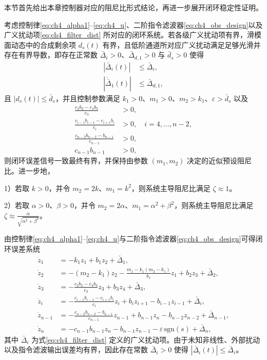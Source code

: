 本节首先给出本章控制器对应的阻尼比形式结论，再进一步展开闭环稳定性证明。

\begin{theorem}\label{thm:ch3_damping_ratio}
考虑控制律\eqref{eq:ch4_alpha1}--\eqref{eq:ch4_u}、二阶指令滤波器\eqref{eq:ch4_obs_design}以及广义扰动项\eqref{eq:ch4_filter_dist} 所对应的闭环系统。若各级广义扰动项有界，滑模面动态中的合成剩余项 $d_s(t)$ 有界，且低阶通道所对应广义扰动满足足够光滑并存在有界导数，即存在正常数 $\bar\Delta_i>0$、$\bar\Delta_{d,1}>0$ 与 $\bar d_s>0$ 使得
\begin{subequations}
\begin{align}
|\bar\Delta_i(t)|&\le \bar\Delta_i,\\
|\dot{\bar\Delta}_1(t)|&\le \bar\Delta_{d,1},
\end{align}
\end{subequations}
且 $|d_s(t)|\le \bar d_s$，并且控制参数满足 $k_1>0$、$m_1>0$、$m_2>k_1$、$\varepsilon>\bar d_s$ 以及
\begin{equation}
\begin{aligned}
\frac{c_2b_2-c_4b_3}{c_3}&>0,\\
\frac{c_{i-1}b_{i-1}-c_{i+1}b_i}{c_i}&>0,\quad i=4,\ldots,n-2,\\
\frac{c_{n-2}b_{n-2}-b_{n-1}}{c_{n-1}}&>0,\\
c_{n-1}b_{n-1}&>0,
\end{aligned}
\end{equation}
则闭环误差信号一致最终有界，并保持由参数 $(m_1,m_2)$ 决定的近似预设阻尼比。进一步地，

1）若取 $k>0$，并令 $m_2=2k$、$m_1=k^2$，则系统主导阻尼比满足 $\zeta\approx1$。

2）若取 $\alpha>0$、$\beta>0$，并令 $m_2=2\alpha$、$m_1=\alpha^2+\beta^2$，则系统主导阻尼比满足 $\zeta\approx\frac{\alpha}{\sqrt{\alpha^2+\beta^2}}$。
\end{theorem}

由控制律\eqref{eq:ch4_alpha1}--\eqref{eq:ch4_u}与二阶指令滤波器\eqref{eq:ch4_obs_design}可得闭环误差系统
\begin{subequations}\label{eq:ch4_236}
\begin{align}
  \dot z_1 &= -k_1z_1+b_1z_2+\bar\Delta_1,\\
  \dot z_2 &= -(m_2-k_1)z_2-\frac{m_1-k_1(m_2-k_1)}{b_1}z_1+b_2z_3+\bar\Delta_2,\\
\dot z_3 &= -\frac{c_2b_2-c_4b_3}{c_3}z_3+b_3z_4+\bar\Delta_3,\\
\dot z_i &= -\frac{c_{i-1}b_{i-1}-c_{i+1}b_i}{c_i}z_i+b_iz_{i+1}-b_{i-1}z_{i-1}+\bar\Delta_i,\\
\dot z_{n-1} &= -\frac{c_{n-2}b_{n-2}-b_{n-1}}{c_{n-1}}z_{n-1}+b_{n-1}z_n-b_{n-2}z_{n-2}+\bar\Delta_{n-1},\\
\dot z_n &= -c_{n-1}b_{n-1}z_n-b_{n-1}z_{n-1}-\varepsilon\,\mathrm{sgn}(s)+\bar\Delta_n,
\end{align}
\end{subequations}
其中 $\bar\Delta_i$ 为式\eqref{eq:ch4_filter_dist} 定义的广义扰动项。由于未知非线性、外部扰动以及指令滤波输出误差均有界，因此存在常数 $\bar\Delta_i>0$ 使得 $|\bar\Delta_i(t)|\le \bar\Delta_i$。

